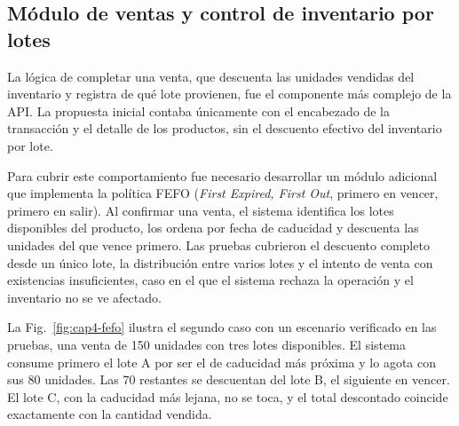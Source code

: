 \subsection{Módulo de ventas y control de inventario por lotes}

La lógica de completar una venta, que descuenta las unidades vendidas del inventario y registra de qué lote provienen, fue el componente más complejo de la API. La propuesta inicial contaba únicamente con el encabezado de la transacción y el detalle de los productos, sin el descuento efectivo del inventario por lote.

Para cubrir este comportamiento fue necesario desarrollar un módulo adicional que implementa la política FEFO (\textit{First Expired, First Out}, primero en vencer, primero en salir). Al confirmar una venta, el sistema identifica los lotes disponibles del producto, los ordena por fecha de caducidad y descuenta las unidades del que vence primero. Las pruebas cubrieron el descuento completo desde un único lote, la distribución entre varios lotes y el intento de venta con existencias insuficientes, caso en el que el sistema rechaza la operación y el inventario no se ve afectado.

La Fig.~\ref{fig:cap4-fefo} ilustra el segundo caso con un escenario verificado en las pruebas, una venta de 150 unidades con tres lotes disponibles. El sistema consume primero el lote A por ser el de caducidad más próxima y lo agota con sus 80 unidades. Las 70 restantes se descuentan del lote B, el siguiente en vencer. El lote C, con la caducidad más lejana, no se toca, y el total descontado coincide exactamente con la cantidad vendida.

